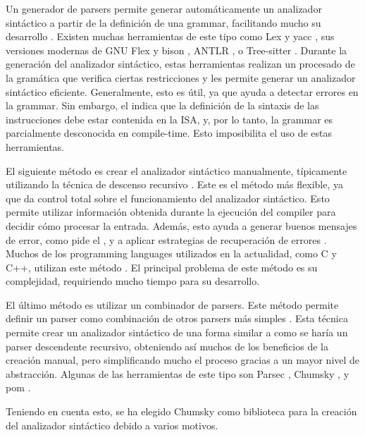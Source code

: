 Un generador de \glspl{parser} permite generar automáticamente un analizador
sintáctico a partir de la definición de una \gls{grammar}, facilitando mucho su
desarrollo \parencite{dragon-book}. Existen muchas herramientas de este tipo
como Lex y yacc \parencite{yacc}, sus versiones modernas de GNU Flex y bison
\parencite{bison}, ANTLR \parencite{ANTLR}, o Tree-sitter
\parencite{tree-sitter}. Durante la generación del analizador sintáctico, estas
herramientas realizan un procesado de la gramática que verifica ciertas
restricciones y les permite generar un analizador sintáctico eficiente.
Generalmente, esto es útil, ya que ayuda a detectar errores en la \gls{grammar}.
Sin embargo, el  indica que la definición de la
sintaxis de las instrucciones debe estar contenida en la \gls{ISA}, y, por lo
tanto, la \gls{grammar} es parcialmente desconocida en \gls{compile-time}. Esto
imposibilita el uso de estas herramientas.

El siguiente método es crear el analizador sintáctico manualmente, típicamente
utilizando la técnica de descenso recursivo \parencite{dragon-book}. Este es el
método más flexible, ya que da control total sobre el funcionamiento del
analizador sintáctico. Esto permite utilizar información obtenida durante la
ejecución del \gls{compiler} para decidir cómo procesar la entrada. Además, esto
ayuda a generar buenos mensajes de error, como pide el
, y a aplicar estrategias de recuperación de errores
\parencite{errors-clang}. Muchos de los \glspl{programming language} utilizados
en la actualidad, como C y C++, utilizan este método
\parencite{parser-types-survey}. El principal problema de este método es su
complejidad, requiriendo mucho tiempo para su desarrollo.

El último método es utilizar un combinador de \glspl{parser}. Este método
permite definir un \gls{parser} como combinación de otros \glspl{parser} más
simples \parencite{parser-combinators}. Esta técnica permite crear un analizador
sintáctico de una forma similar a como se haría un \gls{parser} descendente
recursivo, obteniendo así muchos de los beneficios de la creación manual, pero
simplificando mucho el proceso gracias a un mayor nivel de abstracción. Algunas
de las herramientas de este tipo son Parsec \parencite{parsec}, Chumsky
\parencite{chumsky}, y pom \parencite{pom}.

Teniendo en cuenta esto, se ha elegido Chumsky como biblioteca para la creación
del analizador sintáctico debido a varios motivos.

